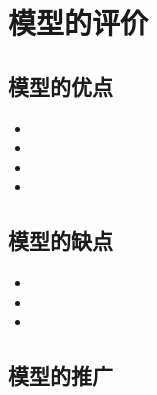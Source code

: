 \documentclass[withoutpreface,bwprint]{cumcmthesis} %
\begin{document}
	
	\section{模型的评价}
		\subsection{模型的优点}
			\begin{itemize}
				\item 
				\item 
				\item 
				\item 
			\end{itemize}
		\subsection{模型的缺点}
			\begin{itemize}
				\item 
				\item 
				\item 
			\end{itemize}
		\subsection{模型的推广}
	
	
	\nocite{*}
	
	
	
\end{document}
